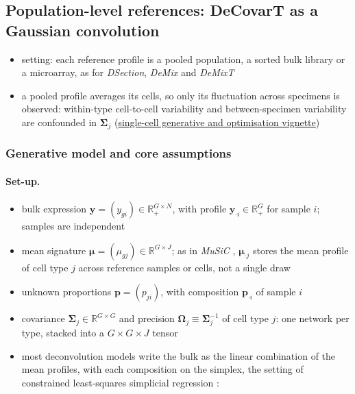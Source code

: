 \documentclass[pdflatex, sn-nature]{sn-jnl}
\theoremstyle{thmstyleone}%
\theoremstyle{thmstyletwo}%
\theoremstyle{thmstylethree}%
\newcommand{\vignette}[2]{\href{https://bastienchassagnol.github.io/DeCovarT/articles/#1}{#2}}
\begin{document}
\subsection{Population-level references: DeCovarT as a Gaussian convolution}
\label{sec:convolution-model}

\begin{itemize}
  \item setting: each reference profile is a pooled population, a sorted bulk library or a microarray, as for
        \emph{DSection}, \emph{DeMix} and \emph{DeMixT}
        \cite{erkkilaProbabilisticAnalysisGene2010,ahnDeMixDeconvolutionMixed2013,wangTranscriptomeDeconvolutionHeterogeneous2018}
  \item a pooled profile averages its cells, so only its fluctuation across specimens is observed: within-type
        cell-to-cell variability and between-specimen variability are confounded in \(\boldsymbol{\Sigma}_{j}\)
        (\vignette{02-1-single-cell-generative-optimisation.html\#sec-facs}{single-cell generative and optimisation vignette})
\end{itemize}

\subsubsection{Generative model and core assumptions}
\label{sec:model}

\paragraph{Set-up.}
\begin{itemize}
  \item bulk expression \(\boldsymbol{y}=(y_{gi})\in\mathbb{R}_{+}^{G\times N}\), with profile
        \(\boldsymbol{y}_{\cdot i}\in\mathbb{R}_{+}^{G}\) for sample \(i\); samples are independent
  \item mean signature \(\boldsymbol{\mu}=(\mu_{gj})\in\mathbb{R}^{G\times J}\); as in \emph{MuSiC}
        \cite{wangBulkTissueCell2019}, \(\boldsymbol{\mu}_{\cdot j}\) stores the mean profile of cell type \(j\)
        across reference samples or cells, not a single draw
  \item unknown proportions \(\boldsymbol{p}=(p_{ji})\), with composition \(\boldsymbol{p}_{\cdot i}\) of sample \(i\)
  \item covariance \(\boldsymbol{\Sigma}_{j}\in\mathbb{R}^{G\times G}\) and \gls{precision}
        \(\boldsymbol{\Omega}_{j}\equiv\boldsymbol{\Sigma}_{j}^{-1}\) of cell type \(j\): one network per type, stacked into a
        \(G\times G\times J\) tensor
  \item most deconvolution models write the bulk as the linear combination of the mean profiles,
        with each composition on the \gls{simplex}, the setting of constrained least-squares simplicial
        regression \cite{tsagrisConstrainedLeastSquares2025}:
\end{itemize}
\end{document}
